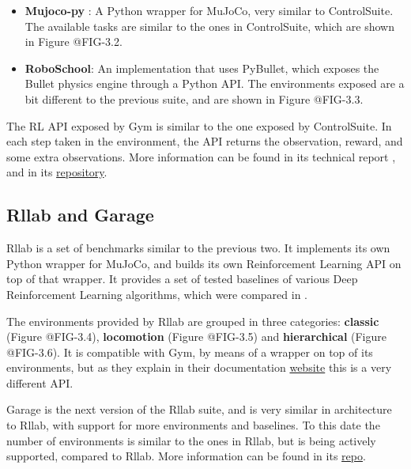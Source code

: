 \begin{itemize}
    \item \textbf{Mujoco-py} : A Python wrapper for MuJoCo, very similar to ControlSuite. 
          The available tasks are similar to the ones in ControlSuite, which are shown 
          in Figure @FIG-3.2.

        \figBenchmarkOpenAIGymMujoco

    \item \textbf{RoboSchool}: An implementation that uses PyBullet, which exposes 
          the Bullet physics engine through a Python API. The environments exposed 
          are a bit different to the previous suite, and are shown in Figure @FIG-3.3. 

        \figBenchmarkOpenAIGymRoboschool

\end{itemize}

The RL API exposed by Gym is similar to the one exposed by ControlSuite. 
In each step taken in the environment, the API returns the observation, 
reward, and some extra observations. More information can be found in its 
technical report \citep{Gym}, and in its \href{https://github.com/openai/gym}{repository}.

\subsection{Rllab and Garage}

Rllab is a set of benchmarks similar to the previous two. It implements its own 
Python wrapper for MuJoCo, and builds its own Reinforcement Learning API on top 
of that wrapper. It provides a set of tested baselines of various Deep Reinforcement 
Learning algorithms, which were compared in \cite{Rllab}. 

The environments provided by Rllab are grouped in three categories: \textbf{classic} 
(Figure @FIG-3.4), \textbf{locomotion} (Figure @FIG-3.5) and \textbf{hierarchical} (Figure @FIG-3.6).
It is compatible with Gym, by means of a wrapper on top of its environments, 
but as they explain in their documentation \href{https://rllab.readthedocs.io/en/latest/user/gym_integration.html}{website} 
this is a very different API.

\figBenchmarkRllabClassic

\figBenchmarkRllabLocomotion

\figBenchmarkRllabHierarchical

Garage is the next version of the Rllab suite, and is very similar in architecture 
to Rllab, with support for more environments and baselines. To this date the number 
of environments is similar to the ones in Rllab, but is being actively supported, 
compared to Rllab. More information can be found in its \href{https://github.com/rlworkgroup/garage}{repo}.

